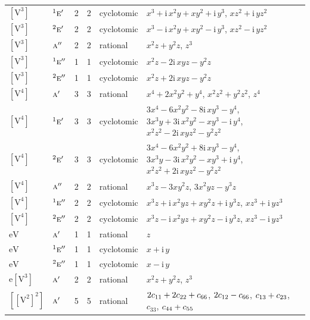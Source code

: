 \documentclass[10pt,a4paper]{article}
\numberwithin{equation}{section}
\newcommand{\irr}[1]{\text{\normalfont\scshape #1}}
\newcommand{\conjpair}[1]{{}^{#1}}
\newcommand{\iunit}{\mathrm{i}}
\newcommand{\jahn}[1]{\mathrm{#1}}
\newlength{\fillwidth}\newlength{\cellwidth}\newlength{\colwidth}
\newcommand{\signbreak}{\penalty100\relax}
\begin{document}
{\begin{longtable}{@{}llrrl>{\RaggedRight\arraybackslash}p{\fillwidth}@{}}
$\jahn{[V^{3}]}$ & $\conjpair{1}\irr{e}'$ & 2 & 2 & cyclotomic & $x^{3} + \iunit{}\,x^{2}y + xy^{2} + \iunit{}\,y^{3}$, $xz^{2} + \iunit{}\,yz^{2}$\\
$\jahn{[V^{3}]}$ & $\conjpair{2}\irr{e}'$ & 2 & 2 & cyclotomic & $x^{3} - \iunit{}\,x^{2}y + xy^{2} - \iunit{}\,y^{3}$, $xz^{2} - \iunit{}\,yz^{2}$\\
$\jahn{[V^{3}]}$ & $\irr{a}''$ & 2 & 2 & rational & $x^{2}z + y^{2}z$, $z^{3}$\\
$\jahn{[V^{3}]}$ & $\conjpair{1}\irr{e}''$ & 1 & 1 & cyclotomic & $x^{2}z - 2\iunit{}\,xyz - y^{2}z$\\
$\jahn{[V^{3}]}$ & $\conjpair{2}\irr{e}''$ & 1 & 1 & cyclotomic & $x^{2}z + 2\iunit{}\,xyz - y^{2}z$\\
$\jahn{[V^{4}]}$ & $\irr{a}'$ & 3 & 3 & rational & $x^{4} + 2x^{2}y^{2} + y^{4}$, $x^{2}z^{2} + y^{2}z^{2}$, $z^{4}$\\
$\jahn{[V^{4}]}$ & $\conjpair{1}\irr{e}'$ & 3 & 3 & cyclotomic & $3x^{4} - 6x^{2}y^{2} - 8\iunit{}\,xy^{3} - y^{4}$, $3x^{3}y + 3\iunit{}\,x^{2}y^{2} - xy^{3} - \iunit{}\,y^{4}$, $x^{2}z^{2} - 2\iunit{}\,xyz^{2} - y^{2}z^{2}$\\
$\jahn{[V^{4}]}$ & $\conjpair{2}\irr{e}'$ & 3 & 3 & cyclotomic & $3x^{4} - 6x^{2}y^{2} + 8\iunit{}\,xy^{3} - y^{4}$, $3x^{3}y - 3\iunit{}\,x^{2}y^{2} - xy^{3} + \iunit{}\,y^{4}$, $x^{2}z^{2} + 2\iunit{}\,xyz^{2} - y^{2}z^{2}$\\
$\jahn{[V^{4}]}$ & $\irr{a}''$ & 2 & 2 & rational & $x^{3}z - 3xy^{2}z$, $3x^{2}yz - y^{3}z$\\
$\jahn{[V^{4}]}$ & $\conjpair{1}\irr{e}''$ & 2 & 2 & cyclotomic & $x^{3}z + \iunit{}\,x^{2}yz + xy^{2}z + \iunit{}\,y^{3}z$, $xz^{3} + \iunit{}\,yz^{3}$\\
$\jahn{[V^{4}]}$ & $\conjpair{2}\irr{e}''$ & 2 & 2 & cyclotomic & $x^{3}z - \iunit{}\,x^{2}yz + xy^{2}z - \iunit{}\,y^{3}z$, $xz^{3} - \iunit{}\,yz^{3}$\\
$\jahn{eV}$ & $\irr{a}'$ & 1 & 1 & rational & $z$\\
$\jahn{eV}$ & $\conjpair{1}\irr{e}''$ & 1 & 1 & cyclotomic & $x + \iunit{}\,y$\\
$\jahn{eV}$ & $\conjpair{2}\irr{e}''$ & 1 & 1 & cyclotomic & $x - \iunit{}\,y$\\
$\jahn{e[V^{3}]}$ & $\irr{a}'$ & 2 & 2 & rational & $x^{2}z + y^{2}z$, $z^{3}$\\
$\jahn{[[V^{2}]^{2}]}$ & $\irr{a}'$ & 5 & 5 & rational & $2c_{11} +\signbreak 2c_{22} +\signbreak c_{66}$, $2c_{12} -\signbreak c_{66}$, $c_{13} +\signbreak c_{23}$, $c_{33}$, $c_{44} +\signbreak c_{55}$\\

\end{longtable}}
\end{document}
